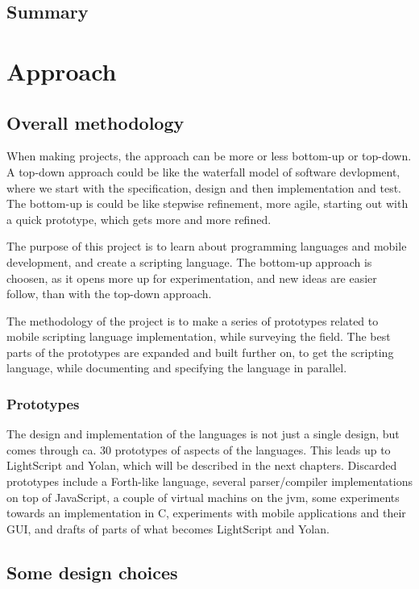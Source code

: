 \documentclass[11pt]{report}
\begin{document}
\section{Summary}
\chapter{Approach}
\label{method}
\section{Overall methodology}

When making projects, the approach can be
more or less bottom-up or top-down.
A top-down approach could be like the waterfall model\cite{waterfall} of software devlopment,
where we start with the specification, design and then implementation and test.
The bottom-up is could be like stepwise refinement\cite{stepwise-refinement}, more agile\cite{agile-manifesto, extreme-programming}, starting out with a quick prototype, which gets more and more refined.

The purpose of this project is to learn about programming languages and mobile development, and create a scripting language. 
The bottom-up approach is choosen, as it opens more up for experimentation, and new ideas are easier follow, than with the top-down approach.

The methodology of the project is to make a series of prototypes related to mobile scripting language implementation, while surveying the field. 
The best parts of the prototypes are expanded and built further on, to get the scripting language, while documenting and specifying the language in parallel.

\subsection{Prototypes}
The design and implementation of the languages is not just a single design, but comes through ca. 30 prototypes of aspects of the languages.
This leads up to LightScript and Yolan, which will be described in the next chapters.
Discarded prototypes include a Forth-like language, several parser/compiler implementations on top of JavaScript, a couple of virtual machins on the jvm, some experiments towards an implementation in C, experiments with mobile applications and their GUI, and drafts of parts of what becomes LightScript and Yolan.

\section{Some design choices}
\end{document}
